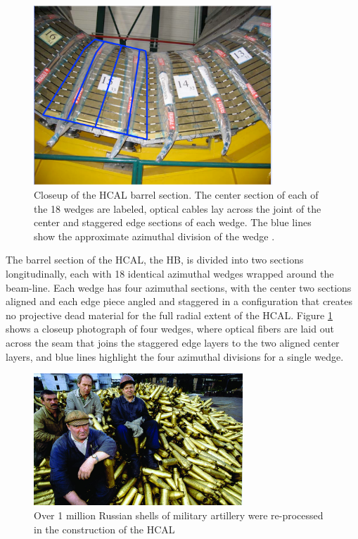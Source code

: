 \begin{figure}[h]
   \centering
  \includegraphics[width=0.8\textwidth]{Figures/CMS_Diagrams/HCAL__Wedge_WithAzDiv.pdf}
  \caption{Closeup of the HCAL barrel section.  The center section of
    each of the 18 wedges are labeled, optical cables lay across the
    joint of the center and staggered edge sections of each wedge.
    The blue lines show the approximate azimuthal division of the
    wedge \cite{CMS:CMS_Machine_Chatrchyan:2008aa}.} \label{fig:hcal_hb_wedge}
\end{figure}

\par The barrel section of the HCAL, the HB, is divided into two
sections longitudinally, each with 18 identical azimuthal wedges
wrapped around the beam-line.  Each wedge has four azimuthal sections,
with the center two sections aligned and each edge piece angled and
staggered in a configuration that creates no projective dead material
for the full radial extent of the HCAL.  Figure
\ref{fig:hcal_hb_wedge} shows a closeup photograph of four wedges,
where optical fibers are laid out across the seam that joins the
staggered edge layers to the two aligned center layers, and blue lines
highlight the four azimuthal divisions for a single wedge.  

\begin{figure}[h]
   \centering
  \includegraphics[width=0.7\textwidth]{Figures/CMS_Diagrams/HCAL__NavyShells.jpg}
  \caption{Over 1 million Russian shells of military artillery were
    re-processed in the construction of the HCAL \cite{CMS:hcal_russian_shells}} \label{fig:hcal_navy_shells}
\end{figure}

